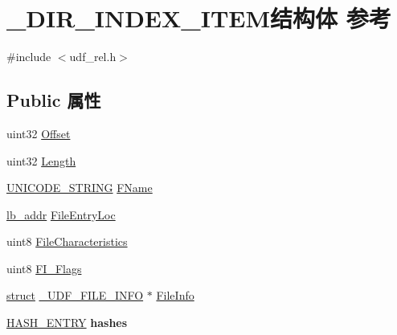 \hypertarget{struct___d_i_r___i_n_d_e_x___i_t_e_m}{}\section{\+\_\+\+D\+I\+R\+\_\+\+I\+N\+D\+E\+X\+\_\+\+I\+T\+E\+M结构体 参考}
\label{struct___d_i_r___i_n_d_e_x___i_t_e_m}


{\ttfamily \#include $<$udf\+\_\+rel.\+h$>$}

\subsection*{Public 属性}
\begin{DoxyCompactItemize}
\item 
uint32 \hyperlink{struct___d_i_r___i_n_d_e_x___i_t_e_m_a480bf65324d876039f63158fb0bd3eb7}{Offset}
\item 
uint32 \hyperlink{struct___d_i_r___i_n_d_e_x___i_t_e_m_abcf8fd23d6cdd3d3520922ad1410bec4}{Length}
\item 
\hyperlink{struct___u_n_i_c_o_d_e___s_t_r_i_n_g}{U\+N\+I\+C\+O\+D\+E\+\_\+\+S\+T\+R\+I\+NG} \hyperlink{struct___d_i_r___i_n_d_e_x___i_t_e_m_a053732cde59e0b48689142d270212ac6}{F\+Name}
\item 
\hyperlink{structlb__addr}{lb\+\_\+addr} \hyperlink{struct___d_i_r___i_n_d_e_x___i_t_e_m_aa5997e0f7081c4d93636bc0cfddfb0f9}{File\+Entry\+Loc}
\item 
uint8 \hyperlink{struct___d_i_r___i_n_d_e_x___i_t_e_m_ab4e803bae65c800a47385cfa7e434919}{File\+Characteristics}
\item 
uint8 \hyperlink{struct___d_i_r___i_n_d_e_x___i_t_e_m_a40f22d199c70d06e1635cbe6dcfb89a2}{F\+I\+\_\+\+Flags}
\item 
\hyperlink{interfacestruct}{struct} \hyperlink{struct___u_d_f___f_i_l_e___i_n_f_o}{\+\_\+\+U\+D\+F\+\_\+\+F\+I\+L\+E\+\_\+\+I\+N\+FO} $\ast$ \hyperlink{struct___d_i_r___i_n_d_e_x___i_t_e_m_a0fdbf0ea62b0c2b5c015062fb0ba4f17}{File\+Info}
\item 
\mbox{\label{struct___d_i_r___i_n_d_e_x___i_t_e_m_af5f0f775238058edf27cf1a892ac72a8}} 
\hyperlink{struct___h_a_s_h___e_n_t_r_y}{H\+A\+S\+H\+\_\+\+E\+N\+T\+RY} {\bfseries hashes}
\item 
\mbox{\label{struct___d_i_r___i_n_d_e_x___i_t_e_m_a631a3ee6fd3df9a09da93e2b0a3ab1c0}} 

\end{DoxyCompactItemize}
